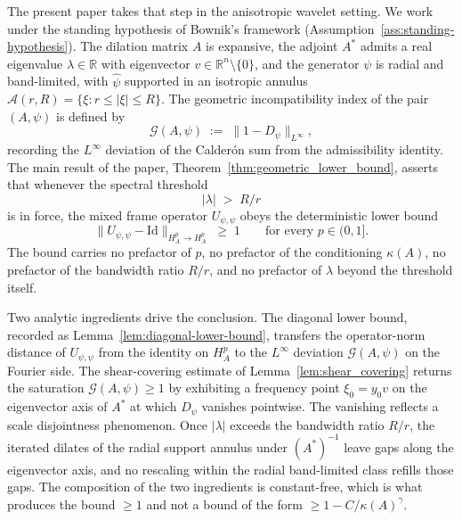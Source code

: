 \documentclass[pdflatex,sn-basic,Numbered]{sn-jnl}
\theoremstyle{thmstyleone}%
\theoremstyle{thmstylethree}%
\begin{document}
The present paper takes that step in the anisotropic wavelet setting.
We work under the standing hypothesis of Bownik's framework
(Assumption~\ref{ass:standing-hypothesis}). The dilation matrix $A$ is
expansive, the adjoint $A^{*}$ admits a real eigenvalue $\lambda \in
\mathbb{R}$ with eigenvector $v \in \mathbb{R}^n \setminus \{0\}$, and
the generator $\psi$ is radial and band-limited, with $\widehat{\psi}$
supported in an isotropic annulus $\mathcal{A}(r, R) = \{ \xi : r \le
|\xi| \le R \}$. The geometric incompatibility index of the pair
$(A, \psi)$ is defined by
\begin{equation*}
	\mathcal{G}(A, \psi) \;:=\; \bigl\| 1 - D_\psi \bigr\|_{L^\infty},
\end{equation*}
recording the $L^\infty$ deviation of the Calder\'on sum from the
admissibility identity. The main result of the paper,
Theorem~\ref{thm:geometric_lower_bound}, asserts that whenever the
spectral threshold
\begin{equation*}
	|\lambda| \;>\; R / r
\end{equation*}
is in force, the mixed frame operator $U_{\psi,\psi}$ obeys the
deterministic lower bound
\begin{equation*}
	\bigl\| U_{\psi, \psi} - \mathrm{Id} \bigr\|_{H^p_A \to H^p_A}
	\;\ge\; 1
	\qquad \text{for every } p \in (0, 1].
\end{equation*}
The bound carries no prefactor of $p$, no prefactor of the conditioning
$\kappa(A)$, no prefactor of the bandwidth ratio $R / r$, and no
prefactor of $\lambda$ beyond the threshold itself.

Two analytic ingredients drive the conclusion. The diagonal lower
bound, recorded as
Lemma~\ref{lem:diagonal-lower-bound}, transfers the operator-norm
distance of $U_{\psi,\psi}$ from the identity on $H^p_A$ to the
$L^\infty$ deviation $\mathcal{G}(A, \psi)$ on the Fourier side. The
shear-covering estimate of Lemma~\ref{lem:shear_covering} returns the
saturation $\mathcal{G}(A, \psi) \ge 1$ by exhibiting a frequency point
$\xi_0 = y_0 v$ on the eigenvector axis of $A^{*}$ at which $D_\psi$
vanishes pointwise. The vanishing reflects a scale disjointness
phenomenon. Once $|\lambda|$ exceeds the bandwidth ratio $R / r$, the
iterated dilates of the radial support annulus under $(A^{*})^{-1}$
leave gaps along the eigenvector axis, and no rescaling within the
radial band-limited class refills those gaps. The composition of the
two ingredients is constant-free, which is what produces the bound
$\ge 1$ and not a bound of the form $\ge 1 - C / \kappa(A)^{\gamma}$.
\end{document}

